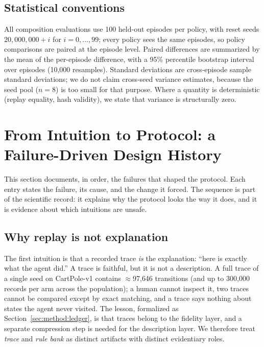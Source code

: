 \documentclass[11pt]{article}
\begin{document}
\subsection{Statistical conventions}
\label{sec:method:stats}

All composition evaluations use 100 held-out episodes per policy, with reset seeds
$20{,}000{,}000 + i$ for $i=0,\ldots,99$; every policy sees the same episodes, so policy comparisons
are paired at the episode level. Paired differences are summarized by the mean of the per-episode
difference, with a 95\% percentile bootstrap interval over episodes (10{,}000 resamples). Standard
deviations are cross-episode sample standard deviations; we do not claim cross-seed variance
estimates, because the seed pool ($n=8$) is too small for that purpose. Where a quantity is
deterministic (replay equality, hash validity), we state that variance is structurally zero.

\section{From Intuition to Protocol: a Failure-Driven Design History}
\label{sec:evolution}

This section documents, in order, the failures that shaped the protocol. Each entry states the
failure, its cause, and the change it forced. The sequence is part of the scientific record: it
explains why the protocol looks the way it does, and it is evidence about which intuitions are
unsafe.

\subsection{Why replay is not explanation}
\label{sec:evolution:replay}

The first intuition is that a recorded trace \emph{is} the explanation: ``here is exactly what the
agent did.'' A trace is faithful, but it is not a description. A full trace of a single seed on
CartPole-v1 contains $\approx$97{,}646 transitions (and up to 300{,}000 records per arm across the
population); a human cannot inspect it, two traces cannot be compared except by exact matching, and
a trace says nothing about states the agent never visited. The lesson, formalized as
Section~\ref{sec:method:ledger}, is that traces belong to the fidelity layer, and a separate
compression step is needed for the description layer. We therefore treat \emph{trace} and
\emph{rule bank} as distinct artifacts with distinct evidentiary roles.
\end{document}
